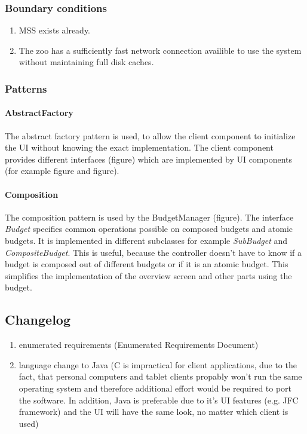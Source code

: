 		\subsubsection{Boundary conditions}
			\begin{enumerate}
				\item MSS exists already.
				\item The zoo has a sufficiently fast network connection availible to use the system without maintaining full disk caches.
			\end{enumerate}
		\subsubsection{Patterns}
			\paragraph{AbstractFactory}
				The abstract factory pattern is used, to allow the client component to initialize the UI without knowing the exact implementation. The client component provides different interfaces (figure) which are implemented by UI components (for example figure and figure).
			\paragraph{Composition}
				The composition pattern is used by the BudgetManager (figure). The interface \emph{Budget} specifies common operations possible on composed budgets and atomic budgets. It is implemented in different subclasses for example \emph{SubBudget} and \emph{CompositeBudget}. This is useful, because the controller doesn't have to know if a budget is composed out of different budgets or if it is an atomic budget. This simplifies the implementation of the overview screen and other parts using the budget.

	\subsection{Changelog}
		\begin{enumerate}
			\item enumerated requirements (Enumerated Requirements Document)
			\item language change to Java (C is impractical for client applications, due to the fact, that personal computers and tablet clients propably won't run the same operating system and therefore additional effort would be required to port the software. In addition, Java is preferable due to it's UI features (e.g. JFC framework) and the UI will have the same look, no matter which client is used)
		\end{enumerate}
